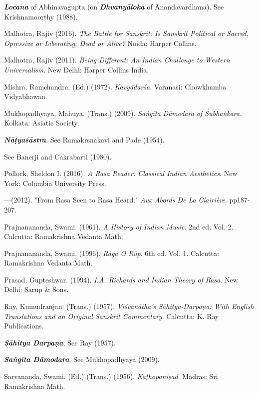 \begin{thebibliography}{99}
{\sl\bfseries Locana} of Abhinavagupta (on {\sl\bfseries Dhvanyāloka} of Ānandavardhana). See Krishnamoorthy (1988).

Malhotra, Rajiv (2016). \textsl{The Battle for Sanskrit: Is Sanskrit Political or Sacred, Opressive or Liberating, Dead or Alive?} Noida: Harper Collins.

Malhotra, Rajiv (2011). \textsl{Being Different: An Indian Challenge to Western Universalism}. New Delhi: Harper Collins India. 

Mishra, Ramchandra. (Ed.) (1972). \textsl{Kavyādarśa}. Varanasi: Chowkhamba Vidyabhawan.

Mukhopadhyaya, Mahuya. (Trans.) (2009). \textsl{Saṅgīta Dāmodara of Śubhaṅkara.} Kolkata: Asiatic Society. 

{\sl\bfseries Nāṭyaśāstra}. See Ramakrsnakavi and Pade (1954).

See Banerji and Cakrabarti (1980).

Pollock, Sheldon I. (2016). \textsl{A Rasa Reader: Classical Indian Aesthetics}. New York: Columbia University Press. 

---\kern3pt(2012). "From Rasa Seen to Rasa Heard." \textsl{Aux Abords De La Clairière}. pp187-207. 

Prajnanananda, Swami. (1961). \textsl{A History of Indian Music}. 2nd ed. Vol. 2. Calcutta: Ramakrishna Vedanta Math. 

Prajnanananda, Swami. (1996). \textsl{Rāga O Rūp}. 6th ed. Vol. 1. Calcutta: Ramakrishna Vedanta Math. 

Prasad, Gupteshwar. (1994). \textsl{I.A. Richards and Indian Theory of Rasa}. New Delhi: Sarup \& Sons.

Ray, Kumudranjan. (Trans.) (1957). \textsl{Viśvanātha's Sāhitya-Darpaṇa: With English Translations and an Original Sanskrit Commentary}. Calcutta: K. Ray Publications. 

{\sl\bfseries Sāhitya Darpaṇa}. See Ray (1957).

{\sl\bfseries Saṅgīta Dāmodara}. See Mukhopadhyaya (2009).

Sarvananda, Swami. (Ed.) (Trans.) (1956). \textsl{Kaṭhopaniṣad}. Madras: Sri Ramakrishna Math.


\end{thebibliography}
